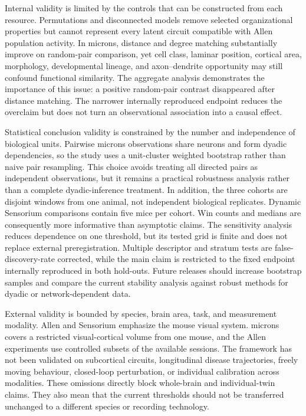 Internal validity is limited by the controls that can be constructed from each
resource. Permutations and disconnected models remove selected organizational
properties but cannot represent every latent circuit compatible with Allen
population activity. In \acs{microns}, distance and degree matching substantially
improve on random-pair comparison, yet cell class, laminar position, cortical
area, morphology, developmental lineage, and axon--dendrite opportunity may
still confound functional similarity. The aggregate analysis demonstrates the
importance of this issue: a positive random-pair contrast disappeared after
distance matching. The narrower internally reproduced endpoint reduces the overclaim but
does not turn an observational association into a causal effect.

Statistical conclusion validity is constrained by the number and independence
of biological units. Pairwise \acs{microns} observations share neurons and form
dyadic dependencies, so the study uses a unit-cluster weighted bootstrap rather
than naive pair resampling. This choice avoids treating all directed pairs as
independent observations, but it remains a practical robustness analysis rather
than a complete dyadic-inference treatment. In addition, the three cohorts are
disjoint windows from one animal, not independent biological replicates. Dynamic
Sensorium comparisons contain five mice per cohort. Win counts and medians are
consequently more informative than asymptotic claims. The sensitivity analysis
reduces dependence on one threshold, but its tested grid is finite and does not
replace external preregistration. Multiple descriptor and stratum tests are
false-discovery-rate corrected, while the main claim is restricted to the fixed
endpoint internally reproduced in both hold-outs. Future releases should
increase bootstrap samples and compare the current stability analysis against
robust methods for dyadic or network-dependent data.

External validity is bounded by species, brain area, task, and measurement
modality. Allen and Sensorium emphasize the mouse visual system. \acs{microns} covers
a restricted visual-cortical volume from one mouse, and the Allen experiments
use controlled subsets of the available sessions. The framework has not been
validated on subcortical circuits, longitudinal disease trajectories, freely
moving behaviour, closed-loop perturbation, or individual calibration across
modalities. These omissions directly block whole-brain and individual-twin
claims. They also mean that the current thresholds should not be transferred
unchanged to a different species or recording technology.

